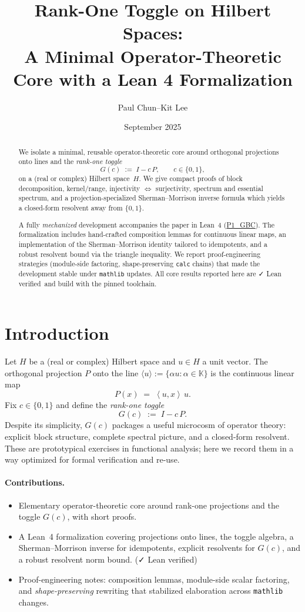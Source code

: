 \documentclass[11pt]{article}
\title{\textbf{Rank-One Toggle on Hilbert Spaces:\\
A Minimal Operator-Theoretic Core with a Lean 4 Formalization}}
\author{Paul Chun--Kit Lee}
\date{September 2025}
\theoremstyle{definition}
\newcommand{\K}{\mathbb{K}}
\newcommand{\ip}[2]{\left\langle #1,#2\right\rangle}
\newcommand{\leanRepoTag}{\href{https://github.com/AICardiologist/FoundationRelativity/tree/main/Papers/P1_GBC}{P1\_GBC}}
\newcommand{\leanok}{\textsf{\small \textcolor{green!60!black}{✓ Lean verified}}}
\begin{document}
\maketitle

\begin{abstract}
We isolate a minimal, reusable operator-theoretic core around orthogonal projections onto lines and the \emph{rank-one toggle}
\[
G(c)\;:=\;I - c\,P,\qquad c\in\{0,1\},
\]
on a (real or complex) Hilbert space~$H$. We give compact proofs of block decomposition, kernel/range, injectivity $\Leftrightarrow$ surjectivity, spectrum and essential spectrum, and a projection-specialized Sherman--Morrison inverse formula which yields a closed-form resolvent away from $\{0,1\}$. 

A fully \emph{mechanized} development accompanies the paper in Lean~4 (\leanRepoTag). The formalization includes hand-crafted composition lemmas for continuous linear maps, an implementation of the Sherman--Morrison identity tailored to idempotents, and a robust resolvent bound via the triangle inequality. We report proof-engineering strategies (module-side factoring, shape-preserving \texttt{calc} chains) that made the development stable under \texttt{mathlib} updates. All core results reported here are \leanok\ and build with the pinned toolchain.
\end{abstract}

\tableofcontents

\section{Introduction}

Let $H$ be a (real or complex) Hilbert space and $u\in H$ a unit vector. The orthogonal projection $P$ onto the line $\langle u\rangle:=\{ \alpha u : \alpha\in\K\}$ is the continuous linear map
\[
P(x) \;=\; \ip{u}{x}\,u.
\]
Fix $c\in\{0,1\}$ and define the \emph{rank-one toggle}
\[
G(c) \;:=\; I - c\,P.
\]
Despite its simplicity, $G(c)$ packages a useful microcosm of operator theory: explicit block structure, complete spectral picture, and a closed-form resolvent. These are prototypical exercises in functional analysis; here we record them in a way optimized for formal verification and re-use.

\paragraph{Contributions.}
\begin{itemize}
\item Elementary operator-theoretic core around rank-one projections and the toggle $G(c)$, with short proofs.
\item A Lean~4 formalization covering projections onto lines, the toggle algebra, a Sherman--Morrison inverse for idempotents, explicit resolvents for $G(c)$, and a robust resolvent norm bound. (\leanok)
\item Proof-engineering notes: composition lemmas, module-side scalar factoring, and \emph{shape-preserving} rewriting that stabilized elaboration across \texttt{mathlib} changes.
\end{itemize}
\end{document}
